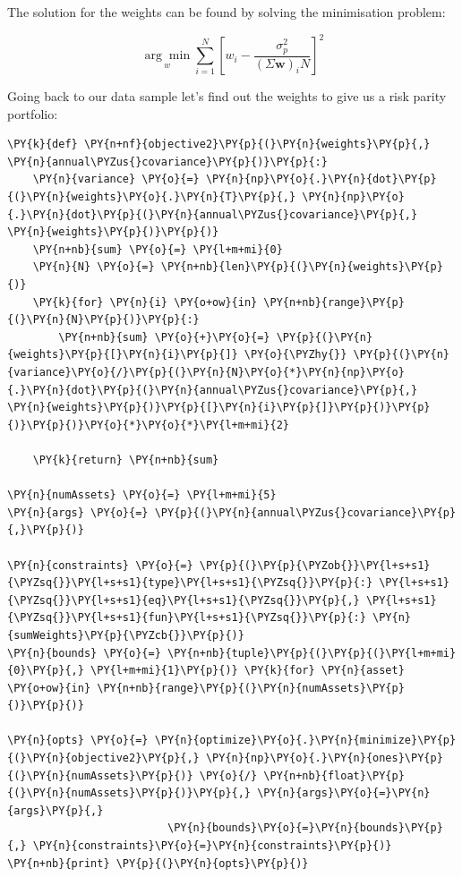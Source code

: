 The solution for the weights can be found by solving the minimisation
problem:

\[ \underset{w}{\arg \min } \sum _{i=1}^{N}\left[w_{i}-{\frac {\sigma_p^{2}}{(\Sigma \mathbf{w})_{i}N}}\right]^{2} \]

Going back to our data sample let's find out the weights to give us a
risk parity portfolio:

    \begin{tcolorbox}[breakable, size=fbox, boxrule=1pt, pad at break*=1mm,colback=cellbackground, colframe=cellborder]
\begin{Verbatim}[commandchars=\\\{\}]
\PY{k}{def} \PY{n+nf}{objective2}\PY{p}{(}\PY{n}{weights}\PY{p}{,} \PY{n}{annual\PYZus{}covariance}\PY{p}{)}\PY{p}{:}
    \PY{n}{variance} \PY{o}{=} \PY{n}{np}\PY{o}{.}\PY{n}{dot}\PY{p}{(}\PY{n}{weights}\PY{o}{.}\PY{n}{T}\PY{p}{,} \PY{n}{np}\PY{o}{.}\PY{n}{dot}\PY{p}{(}\PY{n}{annual\PYZus{}covariance}\PY{p}{,} \PY{n}{weights}\PY{p}{)}\PY{p}{)}
    \PY{n+nb}{sum} \PY{o}{=} \PY{l+m+mi}{0}
    \PY{n}{N} \PY{o}{=} \PY{n+nb}{len}\PY{p}{(}\PY{n}{weights}\PY{p}{)}
    \PY{k}{for} \PY{n}{i} \PY{o+ow}{in} \PY{n+nb}{range}\PY{p}{(}\PY{n}{N}\PY{p}{)}\PY{p}{:}
        \PY{n+nb}{sum} \PY{o}{+}\PY{o}{=} \PY{p}{(}\PY{n}{weights}\PY{p}{[}\PY{n}{i}\PY{p}{]} \PY{o}{\PYZhy{}} \PY{p}{(}\PY{n}{variance}\PY{o}{/}\PY{p}{(}\PY{n}{N}\PY{o}{*}\PY{n}{np}\PY{o}{.}\PY{n}{dot}\PY{p}{(}\PY{n}{annual\PYZus{}covariance}\PY{p}{,} \PY{n}{weights}\PY{p}{)}\PY{p}{[}\PY{n}{i}\PY{p}{]}\PY{p}{)}\PY{p}{)}\PY{p}{)}\PY{o}{*}\PY{o}{*}\PY{l+m+mi}{2}
        
    \PY{k}{return} \PY{n+nb}{sum}

\PY{n}{numAssets} \PY{o}{=} \PY{l+m+mi}{5}
\PY{n}{args} \PY{o}{=} \PY{p}{(}\PY{n}{annual\PYZus{}covariance}\PY{p}{,}\PY{p}{)}

\PY{n}{constraints} \PY{o}{=} \PY{p}{(}\PY{p}{\PYZob{}}\PY{l+s+s1}{\PYZsq{}}\PY{l+s+s1}{type}\PY{l+s+s1}{\PYZsq{}}\PY{p}{:} \PY{l+s+s1}{\PYZsq{}}\PY{l+s+s1}{eq}\PY{l+s+s1}{\PYZsq{}}\PY{p}{,} \PY{l+s+s1}{\PYZsq{}}\PY{l+s+s1}{fun}\PY{l+s+s1}{\PYZsq{}}\PY{p}{:} \PY{n}{sumWeights}\PY{p}{\PYZcb{}}\PY{p}{)}
\PY{n}{bounds} \PY{o}{=} \PY{n+nb}{tuple}\PY{p}{(}\PY{p}{(}\PY{l+m+mi}{0}\PY{p}{,} \PY{l+m+mi}{1}\PY{p}{)} \PY{k}{for} \PY{n}{asset} \PY{o+ow}{in} \PY{n+nb}{range}\PY{p}{(}\PY{n}{numAssets}\PY{p}{)}\PY{p}{)}

\PY{n}{opts} \PY{o}{=} \PY{n}{optimize}\PY{o}{.}\PY{n}{minimize}\PY{p}{(}\PY{n}{objective2}\PY{p}{,} \PY{n}{np}\PY{o}{.}\PY{n}{ones}\PY{p}{(}\PY{n}{numAssets}\PY{p}{)} \PY{o}{/} \PY{n+nb}{float}\PY{p}{(}\PY{n}{numAssets}\PY{p}{)}\PY{p}{,} \PY{n}{args}\PY{o}{=}\PY{n}{args}\PY{p}{,}
                         \PY{n}{bounds}\PY{o}{=}\PY{n}{bounds}\PY{p}{,} \PY{n}{constraints}\PY{o}{=}\PY{n}{constraints}\PY{p}{)}
\PY{n+nb}{print} \PY{p}{(}\PY{n}{opts}\PY{p}{)}  


\end{Verbatim}
\end{tcolorbox}
